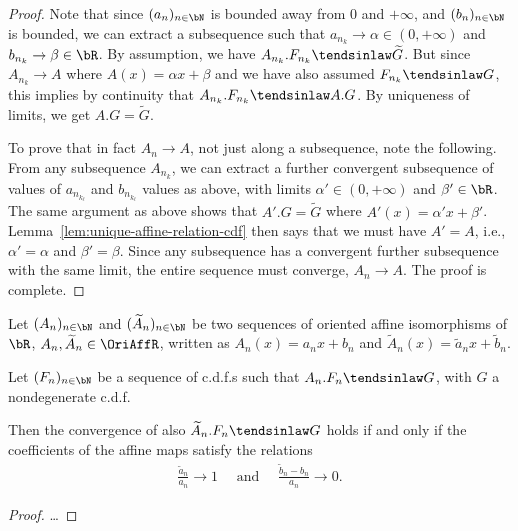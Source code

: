 \begin{proof}
  Note that since $(a_n)_{n \in \bN}$ is bounded away from $0$ and $+\infty$,
  and $(b_n)_{n \in \bN}$ is bounded, we can extract a subsequence such that
  $a_{n_k} \to \alpha \in (0,+\infty)$ and $b_{n_k} \to \beta \in \bR$.
  By assumption, we have $A_{n_k} . F_{n_k} \tendsinlaw \widetilde{G}$.
  But since $A_{n_k} \to A$ where $A(x) = \alpha x + \beta$
  and we have also assumed $F_{n_k} \tendsinlaw G$, this implies by
  continuity that $A_{n_k} . F_{n_k} \tendsinlaw A . G$.
  By uniqueness of limits, we get $A . G = \widetilde{G}$.

  To prove that in fact $A_n \to A$, not just along a subsequence, note the
  following. From any subsequence $A_{n_k}$, we can extract a further
  convergent subsequence of values of $a_{n_{k_\ell}}$ and $b_{n_{k_\ell}}$
  values as above, with limits $\alpha' \in (0,+\infty)$
  and $\beta' \in \bR$. The same argument as above shows that
  $A' . G = \widetilde{G}$ where $A'(x) = \alpha' x + \beta'$.
  Lemma~\ref{lem:unique-affine-relation-cdf} then says that we must have
  $A' = A$, i.e., $\alpha' = \alpha$ and $\beta' = \beta$. Since any
  subsequence has a convergent further subsequence with the same limit,
  the entire sequence must converge, $A_n \to A$.
  The proof is complete.
\end{proof}

\begin{theorem}
  \label{thm:convergence-to-types-different-affine}
  Let $(A_n)_{n \in \bN}$ and
  $(\widetilde{A}_n)_{n \in \bN}$ be two sequences of oriented
  affine isomorphisms of $\bR$, $A_n, \widetilde{A}_n \in \OriAffR$,
  written as $A_n(x) = a_n x + b_n$
  and $\widetilde{A}_n(x) = \tilde{a}_n x + \tilde{b}_n$.

  Let $(F_n)_{n \in \bN}$ be a sequence of c.d.f.s
  such that $A_n.F_n \tendsinlaw G$, with
  $G$ a nondegenerate c.d.f.

  Then the convergence of also $\widetilde{A}_n.F_n \tendsinlaw G$
  holds if and only if the coefficients of the affine maps
  satisfy the relations
  \begin{align*}
    \frac{\tilde{a}_n}{a_n} \to 1
    \quad \text{ and } \quad
    \frac{\tilde{b}_n - b_n}{a_n} \to 0 .
  \end{align*}
\end{theorem}
\begin{proof}
  \ldots
\end{proof}

